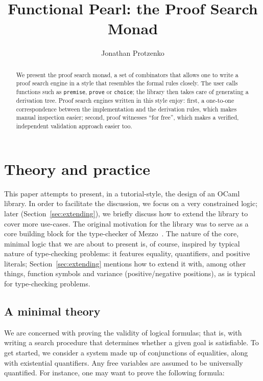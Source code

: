 \documentclass{easychair}
\def\li{\lstinline}
\newcommand{\sref}[1]{Section~\ref{sec:#1}}
\begin{document}
\title{Functional Pearl: the Proof Search Monad}

\author{Jonathan Protzenko}

\maketitle

\begin{abstract}
  We present the proof search monad, a set of combinators that allows one to
  write a proof search engine in a style that resembles the formal rules
  closely. The user calls functions such as \li+premise+, \li+prove+ or
  \li+choice+; the library then takes care of generating a derivation tree.
  Proof search engines written in this style enjoy: first, a one-to-one
  correspondence between the implementation and the derivation rules, which
  makes manual inspection easier; second, proof witnesses ``for free'', which
  makes a verified, independent validation approach easier too.
\end{abstract}

\section{Theory and practice}
\label{sec:intro}

This paper attempts to present, in a tutorial-style, the design of an OCaml
library. In order to facilitate the discussion, we focus on a very constrained
logic; later (\sref{extending}), we briefly discuss how to extend the library to
cover more use-cases. The original motivation for the library was to serve as a
core building block for the type-checker of Mezzo~\cite{protzenko-phd-14}. The
nature of the core, minimal logic that we are about to present is, of course,
inspired by typical nature of type-checking problems: it features equality,
quantifiers, and positive literals; \sref{extending} mentions how to extend it
with, among other things, function symbols and variance (positive/negative
positions), as is typical for type-checking problems.

\subsection{A minimal theory}

We are concerned with proving the validity of logical formulas; that is, with
writing a search procedure that determines whether a given goal is satisfiable.
To get started, we consider a system made up of conjunctions of equalities,
along with existential quantifiers. Any free variables are assumed to be
universally quantified. For instance, one may want to prove the following
formula:
\end{document}
